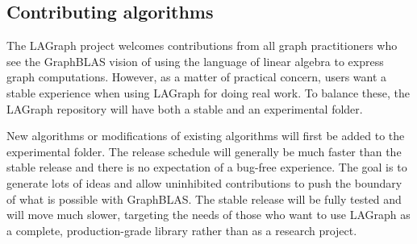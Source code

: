 \subsection{Contributing algorithms}

The LAGraph project welcomes contributions from all graph practitioners who see the GraphBLAS vision
of using the language of linear algebra to express graph computations. However, as a matter of
practical concern, users want a stable experience when using LAGraph for doing real work. To balance
these, the LAGraph repository will have both a stable and an experimental folder.

New algorithms or modifications of existing algorithms will first be added to the experimental folder.
The release schedule will generally be much faster than the stable release and there is no expectation
of a bug-free experience. The goal is to generate lots of ideas and allow uninhibited contributions to
push the boundary of what is possible with GraphBLAS. The stable release will be fully tested and
will move much slower, targeting the needs of those who want to use LAGraph as a complete, production-grade
library rather than as a research project.
